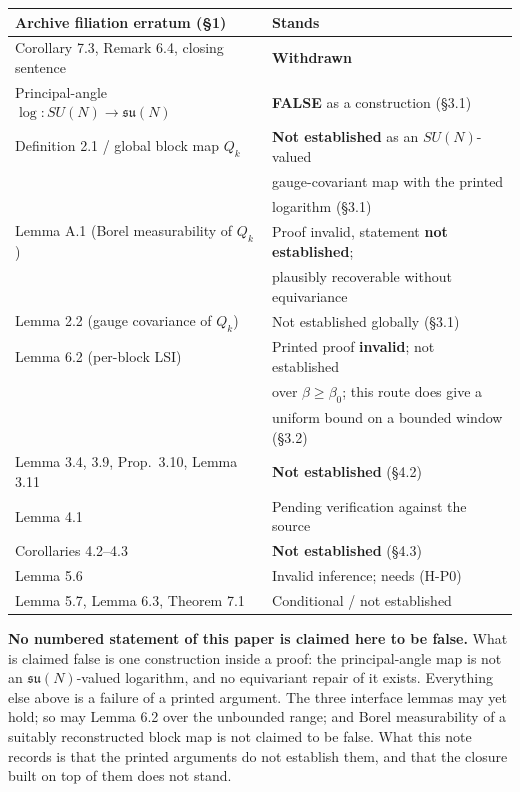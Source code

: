 \documentclass[11pt]{article}
\newcommand{\su}{\mathfrak{su}}
\begin{document}
\begin{center}
\begin{tabular}{|l|l|}
\hline
Archive filiation erratum (\S1) & Stands\\
\hline
Corollary 7.3, Remark 6.4, closing sentence & \textbf{Withdrawn}\\
\hline
Principal-angle $\log:SU(N)\to\su(N)$
 & \textbf{FALSE} as a construction (\S3.1)\\
\hline
Definition 2.1 / global block map $Q_k$
 & \textbf{Not established} as an $SU(N)$-valued\\
 & gauge-covariant map with the printed\\
 & logarithm (\S3.1)\\
\hline
Lemma A.1 (Borel measurability of $Q_k$)
 & Proof invalid, statement \textbf{not established};\\
 & plausibly recoverable without equivariance\\
\hline
Lemma 2.2 (gauge covariance of $Q_k$) & Not established globally (\S3.1)\\
\hline
Lemma 6.2 (per-block LSI)
 & Printed proof \textbf{invalid}; not established\\
 & over $\beta\ge\beta_0$; this route does give a\\
 & uniform bound on a bounded window (\S3.2)\\
\hline
Lemma 3.4, 3.9, Prop.\ 3.10, Lemma 3.11 & \textbf{Not established} (\S4.2)\\
\hline
Lemma 4.1 & Pending verification against the source\\
\hline
Corollaries 4.2--4.3 & \textbf{Not established} (\S4.3)\\
\hline
Lemma 5.6 & Invalid inference; needs (H-P0)\\
\hline
Lemma 5.7, Lemma 6.3, Theorem 7.1 & Conditional / not established\\
\hline
\end{tabular}
\end{center}

\noindent
\textbf{No numbered statement of this paper is claimed here to be false.} What is
claimed false is one construction inside a proof: the principal-angle map is not an
$\su(N)$-valued logarithm, and no equivariant repair of it exists. Everything else
above is a failure of a printed argument. The three interface lemmas may yet hold; so
may Lemma 6.2 over the unbounded range; and Borel measurability of a suitably
reconstructed block map is not claimed to be false. What this note records is that the
printed arguments do not establish them, and that the closure built on top of them does
not stand.
\end{document}
